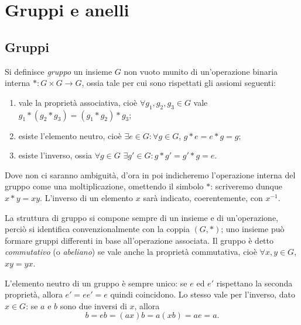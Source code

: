 \chapter{Gruppi e anelli}
\section{Gruppi} \label{sec:gruppi}
\begin{definizione} \label{d:gruppo}
Si definisce \emph{gruppo} un insieme $G$ non vuoto munito di un'operazione binaria interna $*\colon G\times G\to G$, ossia tale per cui sono rispettati gli assiomi seguenti:
\begin{enumerate}
\item vale la proprietà associativa, cioè $\forall g_1,g_2,g_3\in G$ vale $g_1*(g_2*g_3)=(g_1*g_2)*g_3$;
\item esiste l'elemento neutro, cioè $\exists e\in G\colon\forall g\in G$, $g*e=e*g=g$;
\item esiste l'inverso, ossia $\forall g\in G$ $\exists g'\in G\colon g*g'=g'*g=e$.
\end{enumerate}
\end{definizione}
Dove non ci saranno ambiguità, d'ora in poi indicheremo l'operazione interna del gruppo come una moltiplicazione, omettendo il simbolo $*$: scriveremo dunque $x*y=xy$. L'inverso di un elemento $x$ sarà indicato, coerentemente, con $x^{-1}$.

La struttura di gruppo si compone sempre di un insieme e di un'operazione, perciò si identifica convenzionalmente con la coppia $(G,*)$; uno insieme può formare gruppi differenti in base all'operazione associata.
Il gruppo è detto \emph{commutativo} (o \emph{abeliano}) se vale anche la proprietà commutativa, cioè $\forall x,y\in G$, $xy=yx$.

L'elemento neutro di un gruppo è sempre unico: se $e$ ed $e'$ rispettano la seconda proprietà, allora $e'=ee'=e$ quindi coincidono.
Lo stesso vale per l'inverso, dato $x\in G$: se $a$ e $b$ sono due inversi di $x$, allora
\begin{equation}
	b=eb=(ax)b=a(xb)=ae=a.
	\label{eq:unicita-inverso}
\end{equation}

